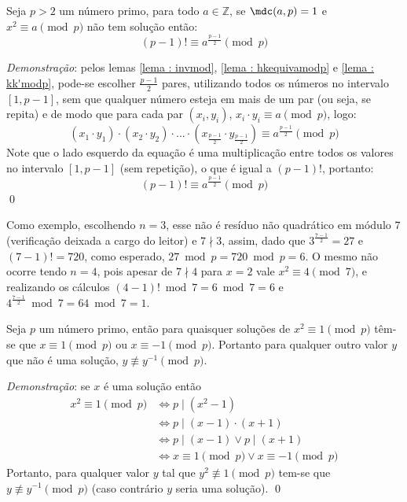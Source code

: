 \begin{lema} \label{lema : modp-1fat}
    Seja $p > 2$ um número primo, para todo $a \in \mathbb{Z}$, se $\mdc(a, p) = 1$ e $x^2 \equiv a \pmod p$ não tem solução então:
    \begin{equation*}
        (p - 1)! \equiv a^{\frac{p-1}{2}} \pmod{p}
    \end{equation*}
    
\end{lema}
\noindent
\textit{Demonstração}: pelos lemas \ref{lema : invmod}, \ref{lema : hkequivamodp} e \ref{lema : kk'modp}, pode-se escolher $\frac{p-1}{2}$ pares, utilizando todos os números no intervalo $[1, p-1]$, sem que qualquer número esteja em mais de um par (ou seja, se repita) e de modo que para cada par $(x_i, y_i)$, $x_i \cdot y_i \equiv a \pmod p$, logo:
    \begin{equation*}
        (x_1 \cdot y_1) \cdot (x_2 \cdot y_2) \cdot ... \cdot \left(x_{\frac{p-1}{2}} \cdot y_{\frac{p-1}{2}}\right) \equiv a^{\frac{p-1}{2}} \pmod{p}
    \end{equation*}
Note que o lado esquerdo da equação é uma multiplicação entre todos os valores no intervalo $[1, p-1]$ (sem repetição), o que é igual a $(p - 1)!$, portanto:
    \begin{equation*}
        (p - 1)! \equiv a^{\frac{p-1}{2}} \pmod{p}
    \end{equation*}
    \qed

Como exemplo, escolhendo $n = 3$, esse não é resíduo não quadrático em módulo $7$ (verificação deixada a cargo do leitor) e $7 \nmid 3$, assim, dado que $3^{\frac{7-1}{2}} = 27$ e $(7 - 1)! = 720$, como esperado, $27 \bmod{p} = 720 \bmod{p} = 6$. O mesmo não ocorre tendo $n = 4$, pois apesar de $7 \nmid 4$ para $x = 2$ vale $x ^ 2 \equiv 4 \pmod{7}$, e realizando os cálculos $(4-1)! \bmod{7} = 6 \bmod{7} = 6$ e $4^{\frac{7 - 1}{2}} \bmod{7} = 64 \bmod{7} = 1$.

\begin{lema} Seja $p$ um número primo, então para quaisquer soluções de $x^2 \equiv 1 \pmod{p}$ têm-se que $x \equiv 1 \pmod{p}$ ou $x \equiv -1 \pmod{p}$. Portanto para qualquer outro valor $y$ que não é uma solução, $y \not\equiv y^{-1} \pmod{p}$.
\label{lema : eq1modp}
\end{lema}
\noindent
\textit{Demonstração}: se $x$ é uma solução então
    \begin{align*}
        x^2 \equiv 1 \pmod{p} &
        \Longleftrightarrow p \mid (x^2 - 1)
        \\
        &
        \Longleftrightarrow p \mid (x - 1) \cdot (x + 1)
        \\
        &
        \Longleftrightarrow p \mid (x - 1) \lor p \mid (x + 1)
        \\
        &
        \Longleftrightarrow x \equiv 1 \pmod{p} \lor x \equiv -1 \pmod{p}
    \end{align*}
Portanto, para qualquer valor $y$ tal que $y^2 \not\equiv 1 \pmod{p}$ tem-se que $y \not\equiv y^{-1} \pmod{p}$ (caso contrário $y$ seria uma solução). \qed

